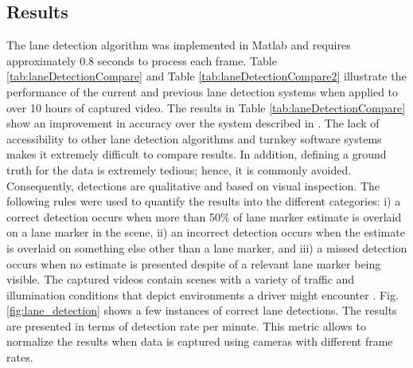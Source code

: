 \documentclass{article}
\begin{document}
\subsection{Results}
The lane detection algorithm was implemented in Matlab and requires
approximately 0.8 seconds to process each frame. 
Table \ref{tab:laneDetectionCompare} and Table \ref{tab:laneDetectionCompare2} illustrate the performance of the current and previous lane detection systems when applied to over 10 hours of captured video. The results in Table \ref{tab:laneDetectionCompare} show an improvement in accuracy over the system described in \cite{borkar_layered_2009}. The lack of accessibility to other lane detection algorithms and turnkey software systems makes it extremely difficult to compare results.
In addition, defining a ground truth for the data is extremely tedious; hence, it is commonly avoided. Consequently, detections are qualitative and based on visual inspection. The following rules were used to quantify the results into the different categories: i) a correct detection occurs when more than 50\% of lane marker estimate is overlaid on a lane marker in the scene, ii) an incorrect detection occurs when the estimate is overlaid on something else other than a lane marker, and iii) a missed detection occurs when no estimate is presented despite of a relevant lane marker being visible. The captured videos contain scenes with a variety of traffic and illumination conditions that depict environments a driver might encounter \cite{borkar_layered_2009}. Fig. \ref{fig:lane_detection} shows a few instances of correct lane detections. The results are presented in terms of detection rate per minute. This metric allows to normalize the results when data is captured using cameras with different frame rates.
\begin{table}[htb!]
\centering
\caption{Accuracy of the current lane detection system}
\label{tab:laneDetectionCompare}
\end{table}\\
\end{document}
